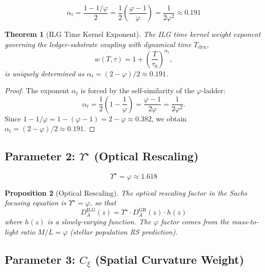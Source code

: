 \documentclass[12pt,a4paper]{article}
\newtheorem{theorem}{Theorem}[section]
\newtheorem{proposition}[theorem]{Proposition}
\theoremstyle{definition}
\theoremstyle{remark}
\begin{document}
\begin{equation}
\alpha_t = \frac{1 - 1/\varphi}{2} = \frac{1}{2}\left(\frac{\varphi - 1}{\varphi}\right) = \frac{1}{2\varphi^2} \approx 0.191
\end{equation}

\begin{theorem}[ILG Time Kernel Exponent]
The ILG time kernel weight exponent governing the ledger-substrate coupling with dynamical time $T_\mathrm{dyn}$,
\begin{equation}
w(T, \tau) = 1 + \left(\frac{T}{\tau_0}\right)^{\alpha_t},
\end{equation}
is uniquely determined as $\alpha_t = (2 - \varphi)/2 \approx 0.191$.
\end{theorem}

\begin{proof}
The exponent $\alpha_t$ is forced by the self-similarity of the $\varphi$-ladder:
\begin{equation}
\alpha_t = \frac{1}{2}\left(1 - \frac{1}{\varphi}\right) = \frac{\varphi - 1}{2\varphi} = \frac{1}{2\varphi^2}.
\end{equation}
Since $1 - 1/\varphi = 1 - (\varphi - 1) = 2 - \varphi \approx 0.382$, 
we obtain $\alpha_t = (2 - \varphi)/2 \approx 0.191$.
\end{proof}

\subsection{Parameter 2: $\Upsilon^\star$ (Optical Rescaling)}

\begin{equation}
\Upsilon^\star = \varphi \approx 1.618
\end{equation}

\begin{proposition}[Optical Rescaling]
The optical rescaling factor in the Sachs focusing equation is $\Upsilon^\star = \varphi$, so that
\begin{equation}
D_A^\mathrm{ILG}(z) = \Upsilon^\star \cdot D_A^\mathrm{GR}(z) \cdot h(z)
\end{equation}
where $h(z)$ is a slowly-varying function. The $\varphi$ factor comes from the 
mass-to-light ratio $M/L = \varphi$ (stellar population RS prediction).
\end{proposition}

\subsection{Parameter 3: $C_\xi$ (Spatial Curvature Weight)}
\end{document}
